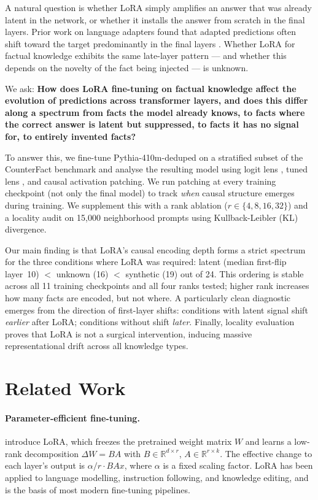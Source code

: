 \documentclass[11pt]{article}
\begin{document}
A natural question is whether LoRA simply amplifies an answer that was already
latent in the network, or whether it installs the answer from scratch in the
final layers.
Prior work on language adapters found that adapted predictions often shift
toward the target predominantly in the final layers
\citep{alabi2024hidden}.
Whether LoRA for factual knowledge exhibits the same late-layer pattern --- and
whether this depends on the novelty of the fact being injected --- is unknown.

We ask: \textbf{How does LoRA fine-tuning on factual knowledge affect the
evolution of predictions across transformer layers, and does this differ
along a spectrum from facts the model already knows, to facts where the
correct answer is latent but suppressed, to facts it has no signal for,
to entirely invented facts?}

To answer this, we fine-tune Pythia-410m-deduped on a stratified subset of the
CounterFact benchmark \citep{meng2022locating} and analyse the resulting model
using logit lens \citep{logitlens2020}, tuned lens \citep{belrose2023eliciting},
and causal activation patching.
We run patching at every training checkpoint (not only the final model) to
track \emph{when} causal structure emerges during training.
We supplement this with a rank ablation ($r \in \{4,8,16,32\}$) and a locality
audit on 15{,}000 neighborhood prompts using Kullback-Leibler (KL) divergence.

Our main finding is that LoRA's causal encoding depth forms a strict spectrum
for the three conditions where LoRA was required: latent (median first-flip
layer~10) $<$ unknown (16) $<$ synthetic (19) out of 24.
This ordering is stable across all 11 training checkpoints and all four ranks
tested; higher rank increases how many facts are encoded, but not where.
A particularly clean diagnostic emerges from the direction of first-layer
shifts: conditions with latent signal shift \emph{earlier} after LoRA;
conditions without shift \emph{later}. Finally, locality evaluation proves that 
LoRA is not a surgical intervention, inducing massive representational drift across all knowledge types.

\section{Related Work}

\paragraph{Parameter-efficient fine-tuning.}
\citet{hu2022lora} introduce LoRA, which freezes the pretrained weight matrix
$W$ and learns a low-rank decomposition $\Delta W = BA$ with $B \in
\mathbb{R}^{d \times r}$, $A \in \mathbb{R}^{r \times k}$.
The effective change to each layer's output is $\alpha / r \cdot BAx$, where
$\alpha$ is a fixed scaling factor.
LoRA has been applied to language modelling, instruction following, and
knowledge editing, and is the basis of most modern fine-tuning pipelines.
\end{document}
